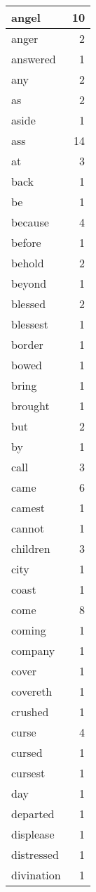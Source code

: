 \begin{center}
\begin{longtable}{l|r}
angel & 10\\ \hline 
anger & 2\\ \hline 
answered & 1\\ \hline 
any & 2\\ \hline 
as & 2\\ \hline 
aside & 1\\ \hline 
ass & 14\\ \hline 
at & 3\\ \hline 
back & 1\\ \hline 
be & 1\\ \hline 
because & 4\\ \hline 
before & 1\\ \hline 
behold & 2\\ \hline 
beyond & 1\\ \hline 
blessed & 2\\ \hline 
blessest & 1\\ \hline 
border & 1\\ \hline 
bowed & 1\\ \hline 
bring & 1\\ \hline 
brought & 1\\ \hline 
but & 2\\ \hline 
by & 1\\ \hline 
call & 3\\ \hline 
came & 6\\ \hline 
camest & 1\\ \hline 
cannot & 1\\ \hline 
children & 3\\ \hline 
city & 1\\ \hline 
coast & 1\\ \hline 
come & 8\\ \hline 
coming & 1\\ \hline 
company & 1\\ \hline 
cover & 1\\ \hline 
covereth & 1\\ \hline 
crushed & 1\\ \hline 
curse & 4\\ \hline 
cursed & 1\\ \hline 
cursest & 1\\ \hline 
day & 1\\ \hline 
departed & 1\\ \hline 
displease & 1\\ \hline 
distressed & 1\\ \hline 
divination & 1\\ \hline 

\end{longtable}
\end{center}
